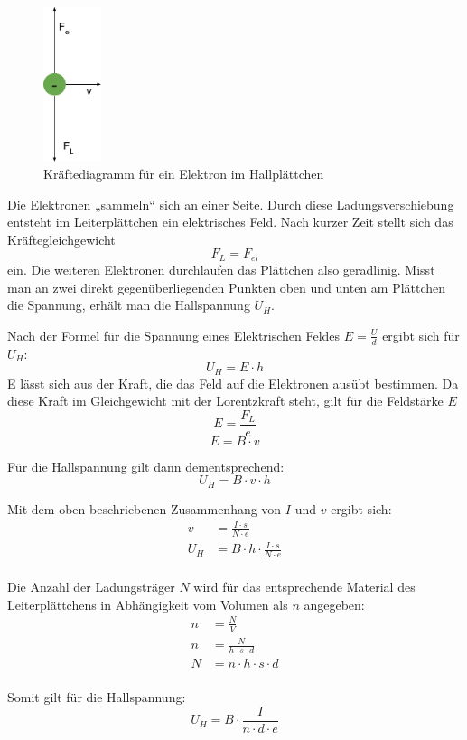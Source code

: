 \begin{figure}[H]
\centering
\includegraphics[width=0.15\textwidth]{img/halleffekt_kraft.pdf}
\caption{Kräftediagramm für ein Elektron im Hallplättchen}
\end{figure}

Die Elektronen „sammeln“ sich an einer Seite. Durch diese Ladungsverschiebung entsteht im Leiterplättchen ein elektrisches Feld. Nach kurzer Zeit stellt sich das Kräftegleichgewicht
$$F_L = F_{el}$$
ein. Die weiteren Elektronen durchlaufen das Plättchen also geradlinig.
Misst man an zwei direkt gegenüberliegenden Punkten oben und unten am Plättchen die Spannung, erhält man die Hallspannung $U_H$.

Nach der Formel für die Spannung eines Elektrischen Feldes $E = \frac{U}{d}$ ergibt sich für $U_H$:
$$U_H = E \cdot h$$
E lässt sich aus der Kraft, die das Feld auf die Elektronen ausübt bestimmen. Da diese Kraft im Gleichgewicht mit der Lorentzkraft steht, gilt für die Feldstärke $E$
$$E = \frac{F_L}{e}$$
$$E = B \cdot v$$

Für die Hallspannung gilt dann dementsprechend:
$$U_H = B \cdot v \cdot h$$

Mit dem oben beschriebenen Zusammenhang von $I$ und $v$ ergibt sich:
\begin{align*}
v &= \frac{I \cdot s}{N \cdot e} \\
U_H &= B \cdot h \cdot \frac{I \cdot s}{N \cdot e} \\
\end{align*}

Die Anzahl der Ladungsträger $N$ wird für das entsprechende Material des Leiterplättchens in Abhängigkeit vom Volumen als $n$ angegeben:
\begin{align*}
n &= \frac{N}{V} \\
n &= \frac{N}{h \cdot s \cdot d} \\
N &= n \cdot h \cdot s \cdot d \\
\end{align*}

Somit gilt für die Hallspannung:
$$U_H = B \cdot \frac{I}{n \cdot d \cdot e}$$